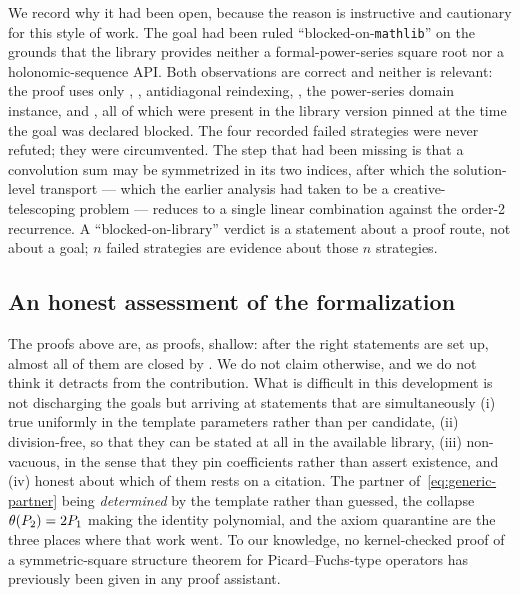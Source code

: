 \begin{itemize}
  We record why it had been open, because the reason is instructive and
  cautionary for this style of work. The goal had been ruled
  ``blocked-on-\texttt{mathlib}'' on the grounds that the library provides
  neither a formal-power-series square root nor a holonomic-sequence API. Both
  observations are correct and neither is relevant: the proof uses only
  , , antidiagonal reindexing,
  , the power-series domain instance, and
  , all of which were present in the
  library version pinned at the time the goal was declared blocked. The four
  recorded failed strategies were never refuted; they were circumvented. The
  step that had been missing is that a convolution sum may be symmetrized in
  its two indices, after which the solution-level transport --- which the
  earlier analysis had taken to be a creative-telescoping problem --- reduces to
  a single linear combination against the order-2 recurrence. A
  ``blocked-on-library'' verdict is a statement about a proof route, not about a
  goal; $n$ failed strategies are evidence about those $n$ strategies.
\end{itemize}

\subsection{An honest assessment of the formalization}

The proofs above are, as proofs, shallow: after the right statements are set
up, almost all of them are closed by . We do not claim
otherwise, and we do not think it detracts from the contribution. What is
difficult in this development is not discharging the goals but arriving at
statements that are simultaneously (i) true uniformly in the template
parameters rather than per candidate, (ii) division-free, so that they can be
stated at all in the available library, (iii) non-vacuous, in the sense that
they pin coefficients rather than assert existence, and (iv) honest about
which of them rests on a citation. The partner
of~\eqref{eq:generic-partner} being \emph{determined} by the template rather
than guessed, the collapse $\theta(P_2) = 2P_1$ making the identity
polynomial, and the axiom quarantine are the three places where that work
went. To our knowledge, no kernel-checked proof of a symmetric-square
structure theorem for Picard--Fuchs-type operators has previously been given
in any proof assistant.

